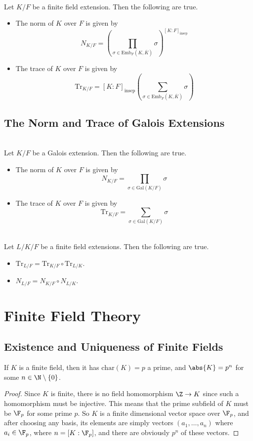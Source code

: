 \documentclass[a4paper]{article}
\begin{document}
\begin{thm}{}{}\\
Let $K/F$ be a finite field extension. Then the following are true. 
\begin{itemize}
\item The norm of $K$ over $F$ is given by $$N_{K/F}=\left(\prod_{\sigma\in\text{Emb}_F(K,\overline{K})}\sigma\right)^{[K:F]_{\text{insep}}}$$
\item The trace of $K$ over $F$ is given by $$\text{Tr}_{K/F}=[K:F]_{\text{insep}}\left(\sum_{\sigma\in\text{Emb}_F(K,\overline{K})}\sigma\right)$$
\end{itemize}
\end{thm}

\subsection{The Norm and Trace of Galois Extensions}
\begin{crl}{}{}\\
Let $K/F$ be a Galois extension. Then the following are true. 
\begin{itemize}
\item The norm of $K$ over $F$ is given by $$N_{K/F}=\prod_{\sigma\in\text{Gal}(K/F)}\sigma$$
\item The trace of $K$ over $F$ is given by $$\text{Tr}_{K/F}=\sum_{\sigma\in\text{Gal}(K/F)}\sigma$$
\end{itemize}
\end{crl}

\begin{crl}{}{}\\
Let $L/K/F$ be a finite field extensions. Then the following are true. 
\begin{itemize}
\item $\text{Tr}_{L/F}=\text{Tr}_{K/F}\circ\text{Tr}_{L/K}$. 
\item $N_{L/F}=N_{K/F}\circ N_{L/K}$. 
\end{itemize}
\end{crl}

\pagebreak
\section{Finite Field Theory}
\subsection{Existence and Uniqueness of Finite Fields}
\begin{prp}{}{} If $K$ is a finite field, then it has $\text{char}(K)=p$ a prime, and $\abs{K}=p^n$ for some $n\in\N\setminus\{0\}$. 
\begin{proof}
Since $K$ is finite, there is no field homomorphism $\Z\to K$ since such a homomorphism must be injective. This means that the prime subfield of $K$ must be $\F_p$ for some prime $p$. So $K$ is a finite dimensional vector space over $\F_p$, and after choosing any basis, its elements are simply vectors $(a_1,\dots,a_n)$ where $a_i\in\F_p$, where $n=[K:\F_p]$, and there are obviously $p^n$ of these vectors. 
\end{proof}
\end{prp}
\end{document}
